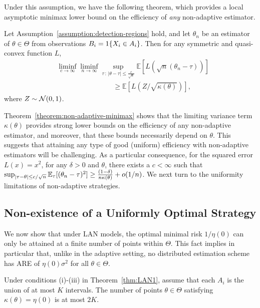 Under this assumption, we have the following theorem, which provides
a local asymptotic minimax lower bound on the efficiency of
\emph{any} non-adaptive estimator.
\begin{theorem}
  \label{theorem:non-adaptive-minimax}
  Let Assumption~\ref{assumption:detection-regions} hold, and
  let ${\theta}_n$ be an estimator of $\theta \in \Theta$ from
  observations $B_i = 1\!\left\{X_i \in A_i\right\}$.
  Then for any
  symmetric and quasi-convex function $L$,
  \begin{align*}
    & \liminf_{c \to \infty} \liminf_{n \to \infty} \sup_{\tau\,:\,|\theta-\tau| \leq \frac{c}{\sqrt{n} }}  \mathbb E \left[ L\left( \sqrt{n}({\theta}_{n} - \tau) \right) \right]
    \\
    & \qquad \qquad \qquad \qquad \geq \mathbb E \left[ L (Z/\sqrt{\kappa(\theta)}) \right],
\end{align*}
  where $Z \sim \mathcal{N}(0,1)$.
\end{theorem}

Theorem~\ref{theorem:non-adaptive-minimax} shows that the limiting variance
term $\kappa(\theta)$ provides strong lower bounds on the efficiency of any
non-adaptive estimator, and moreover, that these bounds necessarily depend
on $\theta$. This suggests that attaining any type of good (uniform)
efficiency with non-adaptive estimators will be challenging.  As a
particular consequence, for the squared error $L(x) = x^2$, for any $\delta
> 0$ and $\theta$, there exists a $c < \infty$ such that $\sup_{|\tau -
  \theta| \le c / \sqrt{n}} \mathbb{E}_\tau[(\theta_n - \tau)^2] \ge \frac{(1 -
  \delta)}{n \kappa(\theta)} + o(1/n)$.
We next turn to the uniformity limitations of non-adaptive strategies.

\subsection{Non-existence of a Uniformly Optimal Strategy}

We now show that under LAN models, the optimal minimal risk $1/\eta(0)$ can
only be attained at a finite number of points within $\Theta$. This fact
implies in particular that, unlike in the adaptive setting, no distributed
estimation scheme has ARE of $\eta(0)\sigma^2$ for all $\theta \in \Theta$.

\begin{thm} \label{thm:non_existence}
Under conditions (i)-(iii) in Theorem~\ref{thm:LAN1}, assume that each $A_i$ is the union of at most $K$ intervals. The number of points $\theta \in \Theta$ satisfying $\kappa(\theta) = \eta(0)$ is at most $2K$. 
\end{thm}

